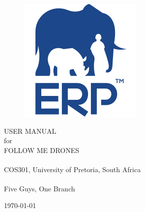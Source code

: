 \documentclass[a4paper,11pt]{book}
\begin{document}
\begin{titlepage}
	\begin{figure}[h!]
		\centering
		\includegraphics[scale=0.5]{./assets/images/erp-logo.png}
		\label{fig: erp-logo}
		\caption{}
	\end{figure}
	\vspace{0.5cm}
	\begin{center}
		\Huge{USER MANUAL}\\
		for\\
		FOLLOW ME DRONES\\
		~\\
		\LARGE{COS301, University of Pretoria, South Africa}\\
		~\\
		Five Guys, One Branch
	\end{center}
	\begin{center}
		\today
	\end{center}
\end{titlepage}
\let\cleardoublepage\clearpage

\tableofcontents

\mainmatter







% 
% 
\end{document}
